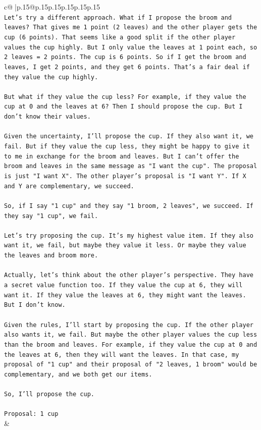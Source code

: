 \documentclass{article}
\begin{document}
{\begin{supertabular}{c@{$\;$}|p{.15\linewidth}@{}p{.15\linewidth}p{.15\linewidth}p{.15\linewidth}p{.15\linewidth}p{.15\linewidth}}
{{{\\ 
\texttt{Let's try a different approach. What if I propose the broom and leaves? That gives me 1 point (2 leaves) and the other player gets the cup (6 points). That seems like a good split if the other player values the cup highly. But I only value the leaves at 1 point each, so 2 leaves = 2 points. The cup is 6 points. So if I get the broom and leaves, I get 2 points, and they get 6 points. That's a fair deal if they value the cup highly.} \\
\\ 
\texttt{But what if they value the cup less? For example, if they value the cup at 0 and the leaves at 6? Then I should propose the cup. But I don't know their values.} \\
\\ 
\texttt{Given the uncertainty, I'll propose the cup. If they also want it, we fail. But if they value the cup less, they might be happy to give it to me in exchange for the broom and leaves. But I can't offer the broom and leaves in the same message as "I want the cup". The proposal is just "I want X". The other player's proposal is "I want Y". If X and Y are complementary, we succeed.} \\
\\ 
\texttt{So, if I say "1 cup" and they say "1 broom, 2 leaves", we succeed. If they say "1 cup", we fail.} \\
\\ 
\texttt{Let's try proposing the cup. It's my highest value item. If they also want it, we fail, but maybe they value it less. Or maybe they value the leaves and broom more.} \\
\\ 
\texttt{Actually, let's think about the other player's perspective. They have a secret value function too. If they value the cup at 6, they will want it. If they value the leaves at 6, they might want the leaves. But I don't know.} \\
\\ 
\texttt{Given the rules, I'll start by proposing the cup. If the other player also wants it, we fail. But maybe the other player values the cup less than the broom and leaves. For example, if they value the cup at 0 and the leaves at 6, then they will want the leaves. In that case, my proposal of "1 cup" and their proposal of "2 leaves, 1 broom" would be complementary, and we both get our items.} \\
\\ 
\texttt{So, I'll propose the cup.} \\
\\ 
\texttt{Proposal: 1 cup} \\
            }
        }
    }
    & \\ \\


\end{supertabular}}
\end{document}
